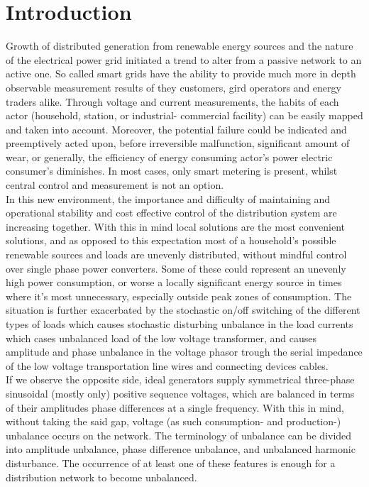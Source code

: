\chapter{Introduction}

Growth of distributed generation from renewable energy sources and the nature of the electrical power grid initiated a trend to alter from a passive network to an active one. So called smart grids have the ability to provide much more in depth observable measurement results of they customers, gird operators and energy traders alike. Through voltage and current measurements, the habits of each actor (household, station, or industrial- commercial facility) can be easily mapped and taken into account. Moreover, the potential failure could be indicated and preemptively acted upon, before irreversible malfunction, significant amount of wear, or generally, the efficiency of energy consuming actor's power electric consumer's diminishes. In most cases, only smart metering is present, whilst central control and measurement is not an option.\\
 In this new environment, the importance and difficulty of maintaining and operational stability and cost effective control of the distribution system are increasing together. With this in mind local solutions are the most convenient solutions, and as opposed to this expectation most of a household's possible renewable sources and loads are unevenly distributed, without mindful control over single phase power converters. Some of these could represent an unevenly high power consumption, or worse a locally significant energy source in times where it's most unnecessary, especially outside peak zones of consumption. The situation is further exacerbated by the stochastic on/off switching of the different types of loads which causes stochastic disturbing unbalance in the load currents which cases unbalanced load of the low voltage transformer, and causes amplitude and phase unbalance in the voltage phasor trough the serial impedance of the low voltage transportation line wires and connecting devices cables.\\
If we observe the opposite side, ideal generators supply symmetrical three-phase sinusoidal (mostly only) positive sequence voltages, which are balanced in terms of their amplitudes phase differences at a single frequency. With this in mind, without taking the said gap, voltage (as such consumption- and production-) unbalance occurs on the network. The terminology of unbalance can be divided into amplitude unbalance, phase difference unbalance, and unbalanced harmonic disturbance. The occurrence of at least one of these features is enough for a distribution network to become unbalanced. \\
